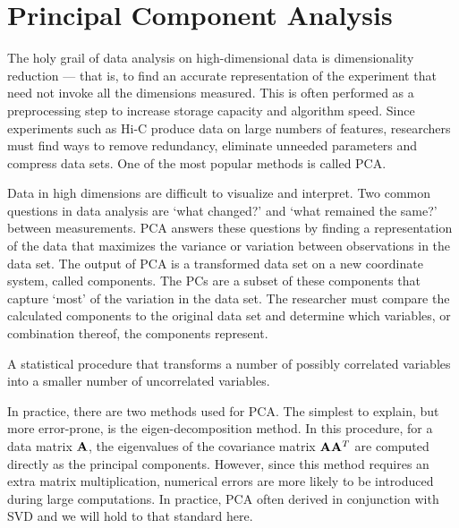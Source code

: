 \section*{Principal Component Analysis}

The holy grail of data analysis on high-dimensional data is dimensionality reduction --- that is, to find an accurate representation of
the experiment that need not invoke all the dimensions measured.  This is often performed as a preprocessing step to increase storage capacity
and algorithm speed.  Since experiments such as Hi-C produce data on large numbers of features, researchers must find ways to remove redundancy,
eliminate unneeded parameters and compress data sets.  One of the most popular methods is called \gls{PCA}\cite{law1987}.

Data in high dimensions are difficult to visualize and interpret.  Two common questions in data analysis are `what changed?' and `what
remained the same?' between measurements.  \gls{PCA} answers these questions by finding a representation of the data that maximizes
the \gls{variance} or variation between observations in the data set.  The output of \gls{PCA} is a transformed data set on a new coordinate
system, called components.  The \glspl{PC} are a subset of these components that capture `most' of the variation in the data set.  The researcher
must compare the calculated components to the original data set and determine which variables, or combination thereof, the components represent.

\begin{defn}
  A statistical procedure that transforms a number of possibly correlated variables into a smaller number of uncorrelated variables.
\end{defn}

In practice, there are two methods used for \gls{PCA}.  The simplest to explain, but more error-prone, is the eigen-decomposition
method\cite{smith2006}.  In this procedure, for a data matrix $\mathbf{A}$, the eigenvalues of the covariance matrix $\mathbf{A}\mathbf{A}^T$
are computed directly as the principal components.  However, since this method requires an extra matrix multiplication, numerical
errors are more likely to be introduced during large computations. In practice, \gls{PCA} often derived in conjunction with \gls{SVD}
and we will hold to that standard here.

